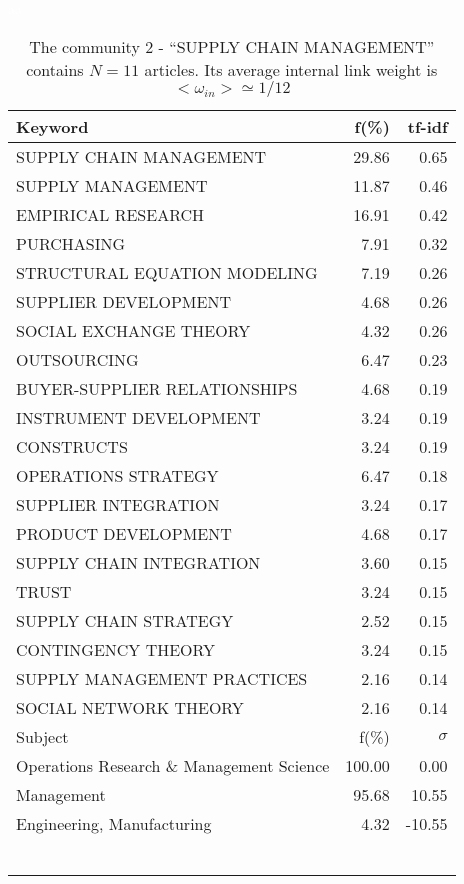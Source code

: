 \documentclass[a4paper,11pt]{report}
\begin{document}
\begin{landscape}
\clearpage

\begin{table}[!ht]
\caption{The community 2 - ``SUPPLY CHAIN MANAGEMENT'' contains $N = 11$ articles. Its average internal link weight is $<\omega_{in}> \simeq 1/12$ }
\textcolor{white}{aa}\\
{\scriptsize\begin{tabular}{|l r  r|}
\hline
Keyword & f(\%) & tf-idf \\
\hline
SUPPLY CHAIN MANAGEMENT & 29.86 & 0.65\\
SUPPLY MANAGEMENT & 11.87 & 0.46\\
EMPIRICAL RESEARCH & 16.91 & 0.42\\
PURCHASING & 7.91 & 0.32\\
STRUCTURAL EQUATION MODELING & 7.19 & 0.26\\
SUPPLIER DEVELOPMENT & 4.68 & 0.26\\
SOCIAL EXCHANGE THEORY & 4.32 & 0.26\\
OUTSOURCING & 6.47 & 0.23\\
BUYER-SUPPLIER RELATIONSHIPS & 4.68 & 0.19\\
INSTRUMENT DEVELOPMENT & 3.24 & 0.19\\
CONSTRUCTS & 3.24 & 0.19\\
OPERATIONS STRATEGY & 6.47 & 0.18\\
SUPPLIER INTEGRATION & 3.24 & 0.17\\
PRODUCT DEVELOPMENT & 4.68 & 0.17\\
SUPPLY CHAIN INTEGRATION & 3.60 & 0.15\\
TRUST & 3.24 & 0.15\\
SUPPLY CHAIN STRATEGY & 2.52 & 0.15\\
CONTINGENCY THEORY & 3.24 & 0.15\\
SUPPLY MANAGEMENT PRACTICES & 2.16 & 0.14\\
SOCIAL NETWORK THEORY & 2.16 & 0.14\\
\hline
\hline
Subject & f(\%) & $\sigma$\\
\hline
Operations Research \& Management Science & 100.00 & 0.00\\
Management & 95.68 & 10.55\\
Engineering, Manufacturing & 4.32 & -10.55\\
 &  & \\
 &  & \\
 &  & \\
 &  & \\
 &  & \\
 &  & \\

\end{tabular}}
\end{table}
\end{landscape}
\end{document}

